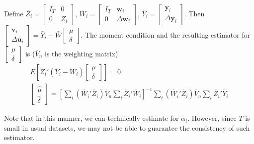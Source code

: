 Define \small{$\bar{Z}_i = \begin{bmatrix}I_T & 0 \\ 0 & Z_i\end{bmatrix}$, $\bar{W}_i=\begin{bmatrix}I_T & \mathbf{w}_i \\ 0 & \Delta\mathbf{w}_i\end{bmatrix}$, $\bar{Y}_i = \begin{bmatrix} \mathbf{y}_i \\ \Delta \mathbf{y}_i\end{bmatrix}$}\normalsize. Then $\begin{bmatrix}\mathbf{v}_i \\ \Delta\mathbf{u}_i \end{bmatrix}=\bar{Y}_i - \bar{W}\begin{bmatrix}\mu \\ \delta\end{bmatrix}$. The moment condition and the resulting estimator for $\begin{bmatrix}\mu \\ \delta\end{bmatrix}$ is ($\bar{V}_n$ is the weighting matrix)
\footnotesize{\begin{gather*}
E\left[\bar{Z}_i'(\bar{Y}_i-\bar{W}_i)\begin{bmatrix}\mu \\ \delta\end{bmatrix}\right]=0\\
\begin{bmatrix}\hat{\mu} \\ \hat{\delta}\end{bmatrix}=\left[\sum_i(\bar{W}_i'\bar{Z}_i)\bar{V}_n\sum_i \bar{Z}_i'\bar{W}_i\right]^{-1}\sum_i(\bar{W}_i'\bar{Z}_i)\bar{V}_n\sum_i \bar{Z}_i'\bar{Y}_i
\end{gather*}}\normalsize\par
Note that in this manner, we can technically estimate for $\alpha_i$. However, since $T$ is small in usual datasets, we may not be able to guarantee the consistency of such estimator. 


